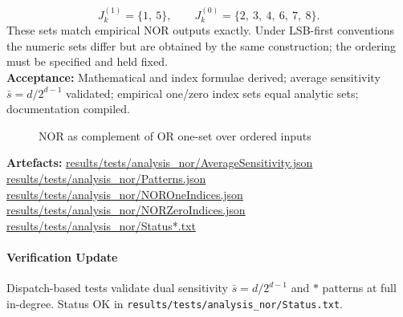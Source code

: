 \documentclass[11pt]{article}
\begin{document}
\[
J_k^{(1)} = \{1,\ 5\},\qquad J_k^{(0)} = \{2,\ 3,\ 4,\ 6,\ 7,\ 8\}.
\]
These sets match empirical NOR outputs exactly. Under LSB-first conventions the numeric sets differ but are obtained by the same construction; the ordering must be specified and held fixed.\\
\textbf{Acceptance:} Mathematical and index formulae derived; average sensitivity \(\bar{s}=d/2^{d-1}\) validated; empirical one/zero index sets equal analytic sets; documentation compiled.\\
\begin{figure}[h]
\centering
{}
\caption{NOR as complement of OR one-set over ordered inputs}
\end{figure}
\textbf{Artefacts:} \url{results/tests/analysis_nor/AverageSensitivity.json}\\
\url{results/tests/analysis_nor/Patterns.json}\\
\url{results/tests/analysis_nor/NOROneIndices.json}\\
\url{results/tests/analysis_nor/NORZeroIndices.json}\\
\url{results/tests/analysis_nor/Status*.txt}
\paragraph{Verification Update} Dispatch-based tests validate dual sensitivity \(\bar{s}=d/2^{d-1}\) and \(*\) patterns at full in-degree. Status OK in \texttt{results/tests/analysis\_nor/Status.txt}.
\end{document}

